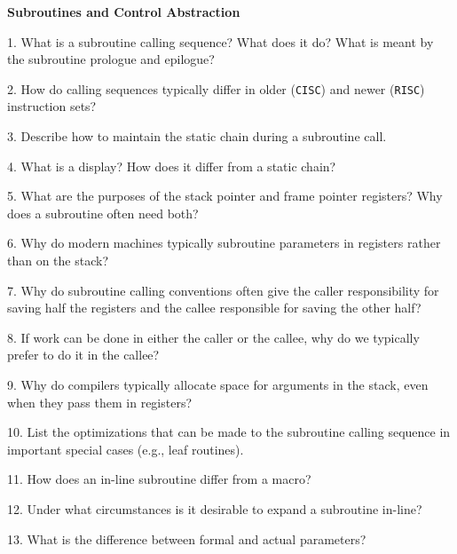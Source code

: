 \centerline{\bf Subroutines and Control Abstraction}

\vskip 1cm

1. What is a subroutine calling sequence? What does it do? What is meant by the subroutine prologue and epilogue?

\filbreak
\vskip 1cm

2. How do calling sequences typically differ in older ({\tt CISC}) and newer ({\tt RISC}) instruction sets?

\filbreak
\vskip 1cm

3. Describe how to maintain the static chain during a subroutine call.

\filbreak
\vskip 1cm

4. What is a display? How does it differ from a static chain?

\filbreak
\vskip 1cm

5. What are the purposes of the stack pointer and frame pointer registers? Why does a subroutine often need both?

\filbreak
\vskip 1cm

6. Why do modern machines typically subroutine parameters in registers rather than on the stack?

\filbreak
\vskip 1cm

7. Why do subroutine calling conventions often give the caller responsibility for saving half the registers and the callee responsible for saving the other half?

\filbreak
\vskip 1cm

8. If work can be done in either the caller or the callee, why do we typically prefer to do it in the callee?

\filbreak
\vskip 1cm

9. Why do compilers typically allocate space for arguments in the stack, even when they pass them in registers?

\filbreak
\vskip 1cm

10. List the optimizations that can be made to the subroutine calling sequence in important special cases (e.g., leaf routines).

\filbreak
\vskip 1cm

11. How does an in-line subroutine differ from a macro?

\filbreak
\vskip 1cm

12. Under what circumstances is it desirable to expand a subroutine in-line?

\filbreak
\vskip 1cm

13. What is the difference between formal and actual parameters?

